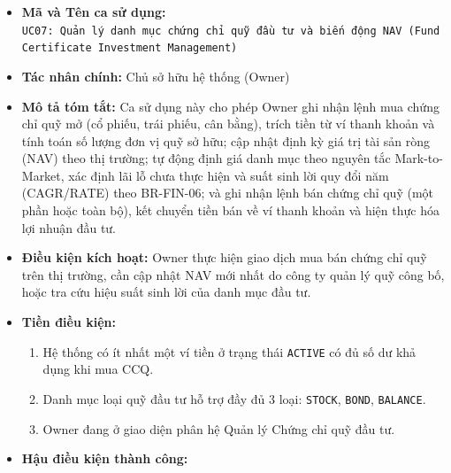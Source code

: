 \documentclass[11pt,a4paper]{article}
\providecommand{\tightlist}{
  \setlength{\itemsep}{0pt}\setlength{\parskip}{0pt}}
\begin{document}
\begin{itemize}
\tightlist
\item
  \textbf{Mã và Tên ca sử dụng:}
  \texttt{UC07:\ Quản\ lý\ danh\ mục\ chứng\ chỉ\ quỹ\ đầu\ tư\ và\ biến\ động\ NAV\ (Fund\ Certificate\ Investment\ Management)}
\item
  \textbf{Tác nhân chính:} Chủ sở hữu hệ thống (Owner)
\item
  \textbf{Mô tả tóm tắt:} Ca sử dụng này cho phép Owner ghi nhận lệnh
  mua chứng chỉ quỹ mở (cổ phiếu, trái phiếu, cân bằng), trích tiền từ
  ví thanh khoản và tính toán số lượng đơn vị quỹ sở hữu; cập nhật định
  kỳ giá trị tài sản ròng (NAV) theo thị trường; tự động định giá danh
  mục theo nguyên tắc Mark-to-Market, xác định lãi lỗ chưa thực hiện và
  suất sinh lời quy đổi năm (CAGR/RATE) theo BR-FIN-06; và ghi nhận lệnh
  bán chứng chỉ quỹ (một phần hoặc toàn bộ), kết chuyển tiền bán về ví
  thanh khoản và hiện thực hóa lợi nhuận đầu tư.
\item
  \textbf{Điều kiện kích hoạt:} Owner thực hiện giao dịch mua bán chứng
  chỉ quỹ trên thị trường, cần cập nhật NAV mới nhất do công ty quản lý
  quỹ công bố, hoặc tra cứu hiệu suất sinh lời của danh mục đầu tư.
\item
  \textbf{Tiền điều kiện:}

  \begin{enumerate}
  \def\labelenumi{\arabic{enumi}.}
  \tightlist
  \item
    Hệ thống có ít nhất một ví tiền ở trạng thái \texttt{ACTIVE} có đủ
    số dư khả dụng khi mua CCQ.
  \item
    Danh mục loại quỹ đầu tư hỗ trợ đầy đủ 3 loại: \texttt{STOCK},
    \texttt{BOND}, \texttt{BALANCE}.
  \item
    Owner đang ở giao diện phân hệ Quản lý Chứng chỉ quỹ đầu tư.
  \end{enumerate}
\item
  \textbf{Hậu điều kiện thành công:}


\end{itemize}
\end{document}
